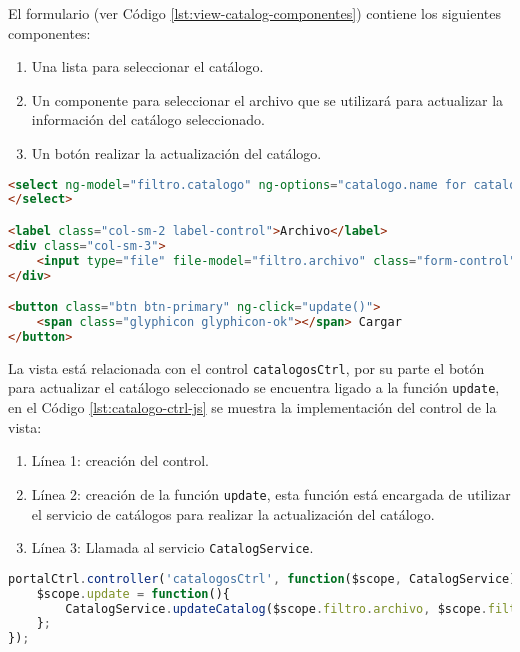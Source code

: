 El formulario (ver Código \ref{lst:view-catalog-componentes}) contiene los siguientes componentes:
\begin{enumerate}
	\item Una lista para seleccionar el catálogo.
	\item Un componente para seleccionar el archivo que se utilizará para actualizar la información del catálogo seleccionado.
	\item Un botón realizar la actualización del catálogo.
\end{enumerate}
\begin{lstlisting}[language=HTML, captionpos=b, caption={Componentes del formulario para seleccionar catálogo.}, label={lst:view-catalog-componentes}]
<select ng-model="filtro.catalogo" ng-options="catalogo.name for catalogo in catalogos" class="form-control">
</select>

<label class="col-sm-2 label-control">Archivo</label>
<div class="col-sm-3">
	<input type="file" file-model="filtro.archivo" class="form-control"/>
</div>

<button class="btn btn-primary" ng-click="update()">
	<span class="glyphicon glyphicon-ok"></span> Cargar
</button>
\end{lstlisting}

La vista está relacionada con el control \texttt{catalogosCtrl}, por su parte el botón para actualizar el catálogo seleccionado se encuentra ligado a la función \texttt{update}, en el Código \ref{lst:catalogo-ctrl-js} se muestra la implementación del control de la vista:

\begin{enumerate}
	\item Línea 1: creación del control. 
	\item Línea 2: creación de la función \texttt{update}, esta función está encargada de utilizar el servicio de catálogos para realizar la actualización del catálogo.
	\item Línea 3: Llamada al servicio \texttt{CatalogService}.
\end{enumerate}

\begin{lstlisting}[language=Javascript, caption={Controlador de la vista Catálogo.}, captionpos=b, label={lst:catalogo-ctrl-js}]
portalCtrl.controller('catalogosCtrl', function($scope, CatalogService){
	$scope.update = function(){
		CatalogService.updateCatalog($scope.filtro.archivo, $scope.filtro.catalogo.name);
	};
});

\end{lstlisting}


